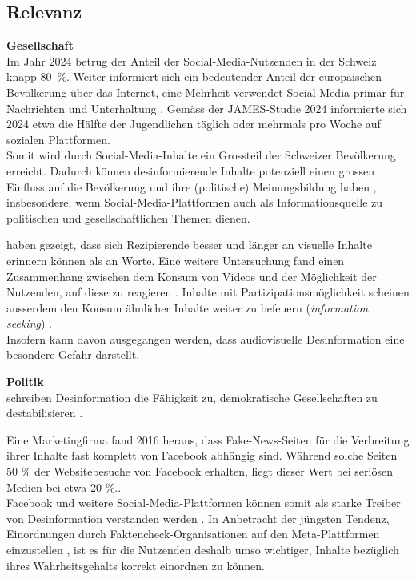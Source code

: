\documentclass[12pt,a4paper]{article}        %
\begin{document}
\subsection{Relevanz}
\textbf{Gesellschaft} \\
Im Jahr 2024 betrug der Anteil der Social-Media-Nutzenden in der Schweiz knapp 80 \%. Weiter informiert sich ein bedeutender Anteil der europäischen Bevölkerung über das Internet, eine Mehrheit verwendet Social Media primär für Nachrichten und Unterhaltung \parencite[21ff]{we_are_social_anteil_2024}. Gemäss der JAMES-Studie 2024 \parencite[40]{kulling-knecht_james_2024} informierte sich 2024 etwa die Hälfte der Jugendlichen täglich oder mehrmals pro Woche auf sozialen Plattformen. \\
Somit wird durch Social-Media-Inhalte ein Grossteil der Schweizer Bevölkerung erreicht. Dadurch können desinformierende Inhalte potenziell einen grossen Einfluss auf die Bevölkerung und ihre (politische) Meinungsbildung haben \parencites[18]{grujic_warnhinweise_2024}[258]{hohlfeld_schlechte_2020}[1f]{khan_fake_2021}, insbesondere, wenn Social-Media-Plattformen auch als Informationsquelle zu politischen und gesellschaftlichen Themen dienen.

\textcite{grady_neural_1998} haben gezeigt, dass sich Rezipierende besser und länger an visuelle Inhalte erinnern können als an Worte. Eine weitere Untersuchung fand einen Zusammenhang zwischen dem Konsum von Videos und der Möglichkeit der Nutzenden, auf diese zu reagieren \parencite[242]{khan_social_2017}. Inhalte mit Partizipationsmöglichkeit scheinen ausserdem den Konsum ähnlicher Inhalte weiter zu befeuern (\textit{information seeking}) \parencite[243]{khan_social_2017}. \\
Insofern kann davon ausgegangen werden, dass audiovisuelle Desinformation eine besondere Gefahr darstellt.

\textbf{Politik} \\
\textcite[258]{hohlfeld_schlechte_2020} schreiben Desinformation die Fähigkeit zu, demokratische Gesellschaften  \parencite[258]{hohlfeld_schlechte_2020} zu destabilisieren \parencite[vgl.\ auch][1]{khan_fake_2021}.

Eine Marketingfirma fand 2016 heraus, dass Fake-News-Seiten für die Verbreitung ihrer Inhalte fast komplett  von Facebook abhängig sind. Während solche Seiten 50 \% der Websitebesuche von Facebook erhalten, liegt dieser Wert bei seriösen Medien bei etwa 20 \%.\parencites{wong_almost_2016}[zit.\ nach][1]{khan_fake_2021}[vgl.\ auch][212]{allcott_social_2017}. \\
Facebook und weitere Social-Media-Plattformen können somit als starke Treiber von Desinformation verstanden werden \parencite{wong_almost_2016}. In Anbetracht der jüngsten Tendenz, Einordnungen durch Faktencheck-Organisationen auf den Meta-Plattformen einzustellen \parencites{isaac_meta_2025}{meta_transparency_centre_penalties_2025}, ist es für die Nutzenden deshalb umso wichtiger, Inhalte bezüglich ihres Wahrheitsgehalts korrekt einordnen zu können.
\end{document}
